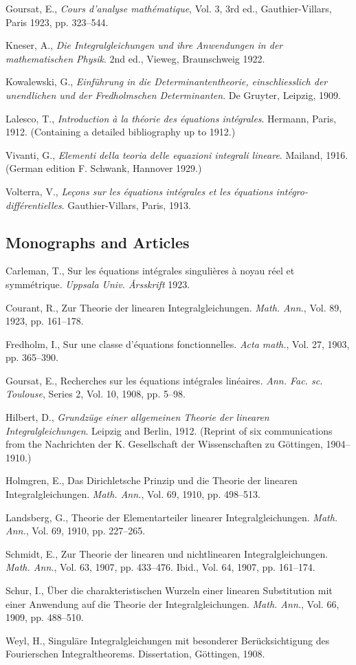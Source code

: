 Goursat, E., \emph{Cours d'analyse math\'ematique}, Vol. 3, 3rd ed., Gauthier-Villars, Paris 1923, pp. 323--544.

Kneser, A., \emph{Die Integralgleichungen und ihre Anwendungen in der mathematischen Physik}. 2nd ed., Vieweg, Braunschweig 1922.

Kowalewski, G., \emph{Einf\"uhrung in die Determinantentheorie, einschliesslich der unendlichen und der Fredholmschen Determinanten}. De Gruyter, Leipzig, 1909.

Lalesco, T., \emph{Introduction \`a la th\'eorie des \'equations int\'egrales}. Hermann, Paris, 1912. (Containing a detailed bibliography up to 1912.)

Vivanti, G., \emph{Elementi della teoria delle equazioni integrali lineare}. Mailand, 1916. (German edition F. Schwank, Hannover 1929.)

Volterra, V., \emph{Le\c{c}ons sur les \'equations int\'egrales et les \'equations int\'egro-diff\'erentielles}. Gauthier-Villars, Paris, 1913.

\subsection*{Monographs and Articles}
Carleman, T., Sur les \'equations int\'egrales singuli\`eres \`a noyau r\'eel et symm\'etrique. \emph{Uppsala Univ. \AA rsskrift} 1923.

Courant, R., Zur Theorie der linearen Integralgleichungen. \emph{Math. Ann.}, Vol. 89, 1923, pp. 161--178.

Fredholm, I., Sur une classe d'\'equations fonctionnelles. \emph{Acta math.}, Vol. 27, 1903, pp. 365--390.

Goursat, E., Recherches sur les \'equations int\'egrales lin\'eaires. \emph{Ann. Fac. sc. Toulouse}, Series 2, Vol. 10, 1908, pp. 5--98.

Hilbert, D., \emph{Grundz\"uge einer allgemeinen Theorie der linearen Integralgleichungen}. Leipzig and Berlin, 1912. (Reprint of six communications from the Nachrichten der K. Gesellschaft der Wissenschaften zu G\"ottingen, 1904--1910.)

Holmgren, E., Das Dirichletsche Prinzip und die Theorie der linearen Integralgleichungen. \emph{Math. Ann.}, Vol. 69, 1910, pp. 498--513.

Landsberg, G., Theorie der Elementarteiler linearer Integralgleichungen. \emph{Math. Ann.}, Vol. 69, 1910, pp. 227--265.

Schmidt, E., Zur Theorie der linearen und nichtlinearen Integralgleichungen. \emph{Math. Ann.}, Vol. 63, 1907, pp. 433--476. Ibid., Vol. 64, 1907, pp. 161--174.

Schur, I., \"Uber die charakteristischen Wurzeln einer linearen Substitution mit einer Anwendung auf die Theorie der Integralgleichungen. \emph{Math. Ann.}, Vol. 66, 1909, pp. 488--510.

Weyl, H., Singul\"are Integralgleichungen mit besonderer Ber\"ucksichtigung des Fourierschen Integraltheorems. Dissertation, G\"ottingen, 1908.
